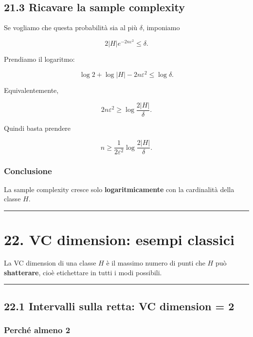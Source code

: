 \documentclass[
]{article}
\begin{document}
\subsection{21.3 Ricavare la sample
complexity}\label{ricavare-la-sample-complexity}

Se vogliamo che questa probabilità sia al più \(\delta\), imponiamo

\[
2|H|e^{-2n\varepsilon^2}\le \delta.
\]

Prendiamo il logaritmo:

\[
\log 2 + \log |H| - 2n\varepsilon^2 \le \log \delta.
\]

Equivalentemente,

\[
2n\varepsilon^2 \ge \log \frac{2|H|}{\delta}.
\]

Quindi basta prendere

\[
n \ge \frac{1}{2\varepsilon^2}\log\frac{2|H|}{\delta}.
\]

\subsubsection{Conclusione}\label{conclusione-10}

La sample complexity cresce solo \textbf{logaritmicamente} con la
cardinalità della classe \(H\).

\begin{center}\rule{0.5\linewidth}{0.5pt}\end{center}

\section{22. VC dimension: esempi
classici}\label{vc-dimension-esempi-classici}

La VC dimension di una classe \(H\) è il massimo numero di punti che
\(H\) può \textbf{shatterare}, cioè etichettare in tutti i modi
possibili.

\begin{center}\rule{0.5\linewidth}{0.5pt}\end{center}

\subsection{22.1 Intervalli sulla retta: VC dimension =
2}\label{intervalli-sulla-retta-vc-dimension-2}

\subsubsection{Perché almeno 2}\label{perchuxe9-almeno-2}
\end{document}
